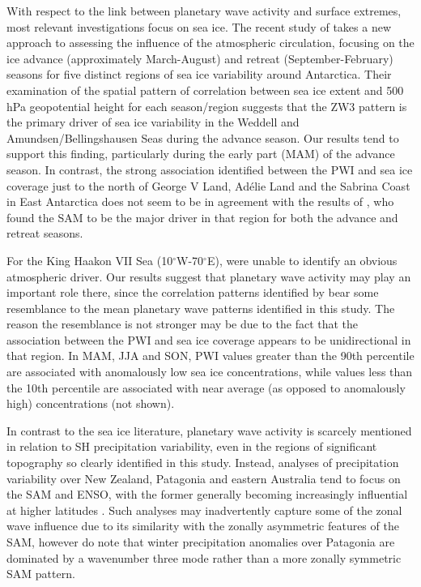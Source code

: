 With respect to the link between planetary wave activity and surface extremes, most relevant investigations focus on sea ice. The recent study of \citet{Raphael2014} takes a new approach to assessing the influence of the atmospheric circulation, focusing on the ice advance (approximately March-August) and retreat (September-February) seasons for five distinct regions of sea ice variability around Antarctica. Their examination of the spatial pattern of correlation between sea ice extent and 500 hPa geopotential height for each season/region suggests that the ZW3 pattern is the primary driver of sea ice variability in the Weddell and Amundsen/Bellingshausen Seas during the advance season. Our results tend to support this finding, particularly during the early part (MAM) of the advance season. In contrast, the strong association identified between the PWI and sea ice coverage just to the north of George V Land, Ad{\'e}lie Land and the Sabrina Coast in East Antarctica does not seem to be in agreement with the results of \citet{Raphael2014}, who found the SAM to be the major driver in that region for both the advance and retreat seasons. 

For the King Haakon VII Sea (10$^{\circ}$W-70$^{\circ}$E), \citet{Raphael2014} were unable to identify an obvious atmospheric driver. Our results suggest that planetary wave activity may play an important role there, since the correlation patterns identified by \citet{Raphael2014} bear some resemblance to the mean planetary wave patterns identified in this study. The reason the resemblance is not stronger may be due to the fact that the association between the PWI and sea ice coverage appears to be unidirectional in that region. In MAM, JJA and SON, PWI values greater than the 90th percentile are associated with anomalously low sea ice concentrations, while values less than the 10th percentile are associated with near average (as opposed to anomalously high) concentrations (not shown).

In contrast to the sea ice literature, planetary wave activity is scarcely mentioned in relation to SH precipitation variability, even in the regions of significant topography so clearly identified in this study. Instead, analyses of precipitation variability over New Zealand, Patagonia and eastern Australia tend to focus on the SAM and ENSO, with the former generally becoming increasingly influential at higher latitudes \citep[e.g.][]{Ummenhofer2007,Aravena2009,Kidston2009,Risbey2009,Garreaud2013,Jiang2013}. Such analyses may inadvertently capture some of the zonal wave influence due to its similarity with the zonally asymmetric features of the SAM, however \citet{Garreaud2013} do note that winter precipitation anomalies over Patagonia are dominated by a wavenumber three mode rather than a more zonally symmetric SAM pattern.

